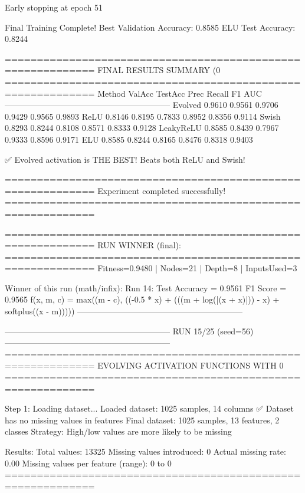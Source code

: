 Early stopping at epoch 51

Final Training Complete!
Best Validation Accuracy: 0.8585
ELU Test Accuracy: 0.8244

============================================================
FINAL RESULTS SUMMARY (0%
============================================================
Method             ValAcc     TestAcc    Prec       Recall     F1         AUC
------------------------------------------------------------
Evolved            0.9610     0.9561     0.9706     0.9429     0.9565     0.9893
ReLU               0.8146     0.8195     0.7833     0.8952     0.8356     0.9114
Swish              0.8293     0.8244     0.8108     0.8571     0.8333     0.9128
LeakyReLU          0.8585     0.8439     0.7967     0.9333     0.8596     0.9171
ELU                0.8585     0.8244     0.8165     0.8476     0.8318     0.9403

✅ Evolved activation is THE BEST! Beats both ReLU and Swish!

============================================================
Experiment completed successfully!
============================================================

============================================================
RUN WINNER (final):
============================================================
Fitness=0.9480 | Nodes=21 | Depth=8 | InputsUsed=3

Winner of this run (math/infix):
  Run 14:
     Test Accuracy = 0.9561
     F1 Score      = 0.9565
     f(x, m, c)    = max((m - c), ((-0.5 * x) + (((m + log(|(x + x)|)) - x) + softplus((x - m)))))
------------------------------------------------------------

------------------------------------------------------------
RUN 15/25 (seed=56)
------------------------------------------------------------
============================================================
EVOLVING ACTIVATION FUNCTIONS
WITH 0%
============================================================

Step 1: Loading dataset...
Loaded dataset: 1025 samples, 14 columns
✅ Dataset has no missing values in features
Final dataset: 1025 samples, 13 features, 2 classes
Strategy: High/low values are more likely to be missing

Results:
  Total values: 13325
  Missing values introduced: 0
  Actual missing rate: 0.00%
  Missing values per feature (range): 0 to 0
============================================================


